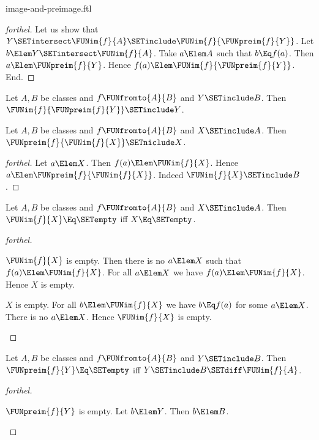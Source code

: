 \documentclass{stex}
\begin{document}
\begin{smodule}{image-and-preimage.ftl}
\begin{proof}[forthel]
  Let us show that $Y \SETintersect \FUNim{f}{A} \SETinclude \FUNim{f}{\FUNpreim{f}{Y}}$.
    Let $b \Elem Y \SETintersect \FUNim{f}{A}$.
    Take $a \Elem A$ such that $b \Eq f(a)$.
    Then $a \Elem \FUNpreim{f}{Y}$.
    Hence $f(a) \Elem \FUNim{f}{\FUNpreim{f}{Y}}$.
  End.
\end{proof}

\begin{corollary}[forthel,id=FOUNDATIONS_07_5585105345052672]
  Let $A, B$ be classes and $f \FUNfromto{A}{B}$ and $Y \SETinclude B$.
  Then $\FUNim{f}{\FUNpreim{f}{Y}} \SETinclude Y$.
\end{corollary}

\begin{proposition}[forthel,id=FOUNDATIONS_07_4890896170483712]
  Let $A, B$ be classes and $f \FUNfromto{A}{B}$ and $X \SETinclude A$.
  Then $\FUNpreim{f}{\FUNim{f}{X}} \SETniclude X$.
\end{proposition}
\begin{proof}[forthel]
  Let $a \Elem X$.
  Then $f(a) \Elem \FUNim{f}{X}$.
  Hence $a \Elem \FUNpreim{f}{\FUNim{f}{X}}$.
  Indeed $\FUNim{f}{X} \SETinclude B$.
\end{proof}

\begin{proposition}[forthel,id=FOUNDATIONS_07_3318372355801088]
  Let $A, B$ be classes and $f \FUNfromto{A}{B}$ and $X \SETinclude A$.
  Then $\FUNim{f}{X} \Eq \SETempty$ iff $X \Eq \SETempty$.
\end{proposition}
\begin{proof}[forthel]
  \begin{case}{$\FUNim{f}{X}$ is empty.}
    Then there is no $a \Elem X$ such that $f(a) \Elem \FUNim{f}{X}$.
    For all $a \Elem X$ we have $f(a) \Elem \FUNim{f}{X}$.
    Hence $X$ is empty.
  \end{case}

  \begin{case}{$X$ is empty.}
    For all $b \Elem \FUNim{f}{X}$ we have $b \Eq f(a)$ for some $a \Elem X$.
    There is no $a \Elem X$.
    Hence $\FUNim{f}{X}$ is empty.
  \end{case}
\end{proof}

\begin{proposition}[forthel,id=FOUNDATIONS_07_8597874786959360]
  Let $A, B$ be classes and $f \FUNfromto{A}{B}$ and $Y \SETinclude B$.
  Then $\FUNpreim{f}{Y} \Eq \SETempty$ iff $Y \SETinclude B \SETdiff \FUNim{f}{A}$.
\end{proposition}
\begin{proof}[forthel]
  \begin{case}{$\FUNpreim{f}{Y}$ is empty.}
    Let $b \Elem Y$.
    Then $b \Elem B$.


\end{case}
\end{proof}
\end{smodule}
\end{document}
